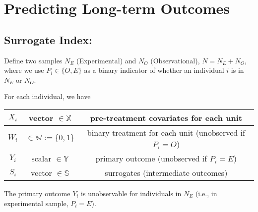 \chapter{Predicting Long-term Outcomes}
\section{Surrogate Index: \cite{athey2019surrogate}}
Define two samples $N_E$ (Experimental) and $N_O$ (Observational), $N=N_E+N_O$, where we use $P_i\in\{O,E\}$ as a binary indicator of whether an individual $i$ is in $N_E$ or $N_O$.

For each individual, we have
\begin{center}
    \begin{tabular}{ccc}
        \hline
            $X_i$& vector $\in\mathbb{X}$ & pre-treatment covariates for each unit\\
        \hline
            $W_i$& $\in\mathbb{W}:=\{0,1\}$ & binary treatment for each unit (unobserved if $P_i=O$)\\
        \hline
            $Y_i$& scalar $\in\mathbb{Y}$ & primary outcome (unobserved if $P_i=E$)\\
            $S_i$& vector $\in\mathbb{S}$ &surrogates (intermediate outcomes)\\
        \hline
    \end{tabular}
\end{center}
The primary outcome $Y_i$ is unobservable for individuals in $N_E$ (i.e., in experimental sample, $P_i=E$).

